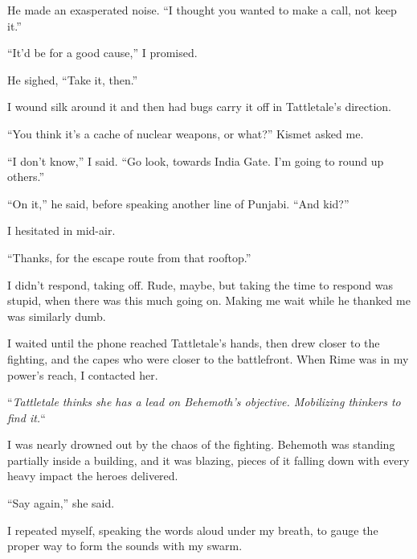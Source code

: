 He made an exasperated noise.  ``I thought you wanted to make a call, not keep it.''



``It'd be for a good cause,'' I promised.



He sighed, ``Take it, then.''



I wound silk around it and then had bugs carry it off in Tattletale's direction.



``You think it's a cache of nuclear weapons, or what?''  Kismet asked me.



``I don't know,'' I said.  ``Go look, towards India Gate.  I'm going to round up others.''



``On it,'' he said, before speaking another line of Punjabi.  ``And kid?''



I hesitated in mid-air.



``Thanks, for the escape route from that rooftop.''



I didn't respond, taking off.  Rude, maybe, but taking the time to respond was stupid, when there was this much going on.  Making me wait while he thanked me was similarly dumb.



I waited until the phone reached Tattletale's hands, then drew closer to the fighting, and the capes who were closer to the battlefront.  When Rime was in my power's reach, I contacted her.



``\emph{Tattletale thinks she has a lead on Behemoth's objective.  Mobilizing thinkers to find it.}``



I was nearly drowned out by the chaos of the fighting.  Behemoth was standing partially inside a building, and it was blazing, pieces of it falling down with every heavy impact the heroes delivered.



``Say again,'' she said.



I repeated myself, speaking the words aloud under my breath, to gauge the proper way to form the sounds with my swarm.



